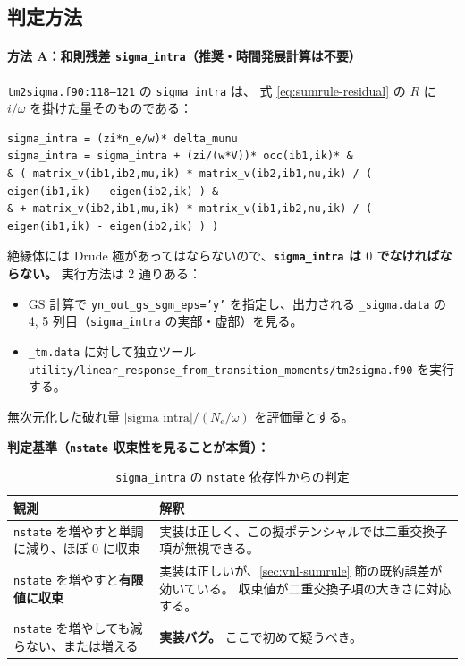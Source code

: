\documentclass[dvipdfmx,a4paper,11pt]{jsarticle}
\newcommand{\file}[1]{\texttt{#1}}
\begin{document}
\subsection{判定方法}

\paragraph{方法 A：和則残差 \texttt{sigma\_intra}（推奨・時間発展計算は不要）}
\file{tm2sigma.f90:118--121} の \verb|sigma_intra| は、
式 \eqref{eq:sumrule-residual} の $R$ に $i/\omega$ を掛けた量そのものである：
%
\begin{lstlisting}[firstnumber=118,caption={\texttt{sigma\_intra}：和則残差の実装}]
sigma_intra = (zi*n_e/w)* delta_munu
sigma_intra = sigma_intra + (zi/(w*V))* occ(ib1,ik)* &
& ( matrix_v(ib1,ib2,mu,ik) * matrix_v(ib2,ib1,nu,ik) / ( eigen(ib1,ik) - eigen(ib2,ik) ) &
& + matrix_v(ib2,ib1,mu,ik) * matrix_v(ib1,ib2,nu,ik) / ( eigen(ib1,ik) - eigen(ib2,ik) ) )
\end{lstlisting}

絶縁体には Drude 極があってはならないので、\textbf{\file{sigma\_intra} は $0$ でなければならない。}
実行方法は 2 通りある：
\begin{itemize}
\item GS 計算で \file{yn\_out\_gs\_sgm\_eps='y'} を指定し、出力される
      \file{\_sigma.data} の 4, 5 列目（\file{sigma\_intra} の実部・虚部）を見る。
\item \file{\_tm.data} に対して独立ツール
      \file{utility/linear\_response\_from\_transition\_moments/tm2sigma.f90} を実行する。
\end{itemize}
無次元化した破れ量 $|\text{sigma\_intra}| / (N_e/\omega)$ を評価量とする。

\textbf{判定基準（\file{nstate} 収束性を見ることが本質）：}
\begin{table}[htbp]
\centering
\caption{\texttt{sigma\_intra} の \texttt{nstate} 依存性からの判定}
\label{tab:sigma-intra-judge}
\begin{tabular}{@{}p{60mm}p{95mm}@{}}
\toprule
\textbf{観測} & \textbf{解釈} \\
\midrule
\file{nstate} を増やすと単調に減り、ほぼ $0$ に収束 &
実装は正しく、この擬ポテンシャルでは二重交換子項が無視できる。 \\[2mm]
\file{nstate} を増やすと\textbf{有限値に収束} &
実装は正しいが、\ref{sec:vnl-sumrule} 節の既約誤差が効いている。
収束値が二重交換子項の大きさに対応する。 \\[2mm]
\file{nstate} を増やしても減らない、または増える &
\textbf{実装バグ。} ここで初めて疑うべき。 \\
\bottomrule
\end{tabular}
\end{table}
\end{document}
